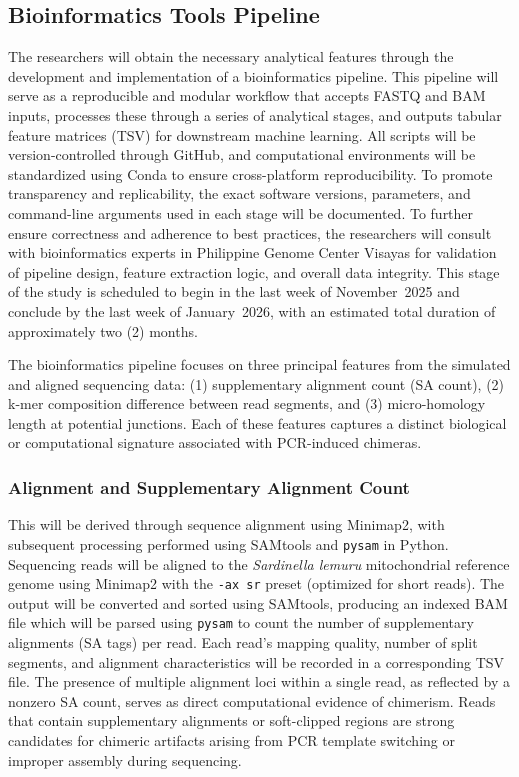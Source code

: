 \subsection{Bioinformatics Tools Pipeline}

The researchers will obtain the necessary analytical features through the development and implementation of a bioinformatics pipeline. This pipeline will serve as a reproducible and modular workflow that accepts FASTQ and BAM inputs, processes these through a series of analytical stages, and outputs tabular feature matrices (TSV) for downstream machine learning. All scripts will be version-controlled through GitHub, and computational environments will be standardized using Conda to ensure cross-platform reproducibility. To promote transparency and replicability, the exact software versions, parameters, and command-line arguments used in each stage will be documented. To further ensure correctness and adherence to best practices, the researchers will consult with bioinformatics experts in Philippine Genome Center Visayas for validation of pipeline design, feature extraction logic, and overall data integrity. This stage of the study is scheduled to begin in the last week of November~2025 and conclude by the last week of January~2026, with an estimated total duration of approximately two (2) months.

The bioinformatics pipeline focuses on three principal features from the simulated and aligned sequencing data: (1) supplementary alignment count (SA count), (2) k-mer composition difference between read segments, and (3) micro-homology length at potential junctions. Each of these features captures a distinct biological or computational signature associated with PCR-induced chimeras.

\subsubsection{Alignment and Supplementary Alignment Count}
This will be derived through sequence alignment using Minimap2, with subsequent processing performed using SAMtools and \texttt{pysam} in Python. Sequencing reads will be aligned to the \textit{Sardinella lemuru} mitochondrial reference genome using Minimap2 with the \texttt{-ax sr} preset (optimized for short reads). The output will be converted and sorted using SAMtools, producing an indexed BAM file which will be parsed using \texttt{pysam} to count the number of supplementary alignments (SA tags) per read. Each read’s mapping quality, number of split segments, and alignment characteristics will be recorded in a corresponding TSV file. The presence of multiple alignment loci within a single read, as reflected by a nonzero SA count, serves as direct computational evidence of chimerism. Reads that contain supplementary alignments or soft-clipped regions are strong candidates for chimeric artifacts arising from PCR template switching or improper assembly during sequencing.


